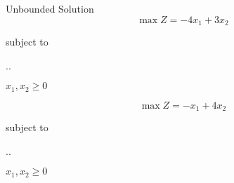   \begin{frameExample}{Unbounded Solution}{}
    \[ \max Z = -4x_1 + 3x_2\]

    {\centering
      subject to

      \vspace{3mm}

      \sysdelim..%

      \vspace{3mm}
      $x_1, x_2 \geq 0$
    \par}
\end{frameExample}

  \begin{frameExample}{}{}
    \[ \max Z = -x_1 + 4x_2\]

    {\centering
      subject to

      \vspace{3mm}

      \sysdelim..%

      \vspace{3mm}
      $x_1, x_2 \geq 0$
    \par}
  \end{frameExample}


